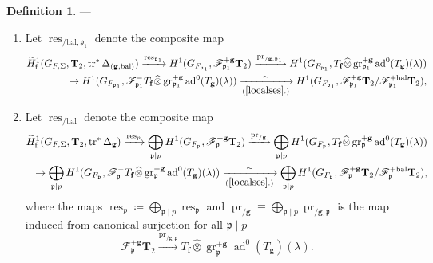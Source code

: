 \documentclass[10pt]{amsart}
\numberwithin{equation}{section}
\theoremstyle{definition}
\newtheorem{defn}[thm]{Definition}
\theoremstyle{remark} %
\newcommand{\ad}{\operatorname{ad}}
\DeclareMathOperator{\res}{res}
\DeclareMathOperator{\tr}{{tr}^*}
\renewcommand{\b}{\mathrm{bal}}
\newcommand{\f}{\mathbf{f}}
\newcommand{\scrF}{\mathscr{F}}
\newcommand{\g}{\mathbf{g}}
\newcommand{\p}{\mathfrak{p}}
\newcommand{\T}{\mathbf{T}}
\begin{document}
	\begin{defn} ---
		\begin{enumerate}
			\item Let $ \res_{/\b, \p_1} $ denote the composite map
			\begin{align}\label{resbal_1}
				\begin{aligned}
					\widetilde{H}^1_{\mathrm{f}}(G_{F,\Sigma},\T_{2}, \tr \Delta_{(\g,\b)}) \xrightarrow{\res_{\p_1}}  H^1(G_{F_{\p_1}},\scrF^{+\g}_{\p_1}\T_{2} ) \xrightarrow{\operatorname{pr}_{/\g,\p_1}}  H^1(G_{F_{\p_1}}, T_\f \widehat{\otimes} \operatorname{gr}^{+\g}_{\p_1}\ad^0(T_\g)(\lambda))   \\
					\rightarrow  H^1(G_{F_{\p_1}}, \scrF^{-}_{\p_1}T_\f \widehat{\otimes} \operatorname{gr}^{+\g}_{\p_1} \ad^0(T_\g)(\lambda)) \xrightarrow[(\ref{localses}.)]{\sim} H^1(G_{F_{\p_1}}, \scrF^{+\g}_{\p_1}\T_{2}/\scrF^{+\b}_{\p_1}\T_{2}),
				\end{aligned}
			\end{align}
			\item Let $ \res_{/\b}$ denote the composite map 
			\begin{align}\label{resbal_2}
				\begin{aligned}
					\widetilde{H}^1_{\mathrm{f}}(G_{F,\Sigma},\T_{2}, \tr \Delta_{\g}) \xrightarrow{\res_p} \bigoplus_{\p \mid p} H^1(G_{F_{\p}},\scrF^{+\g}_{\p}\T_{2} ) \xrightarrow{\operatorname{pr}_{/\g}}  \bigoplus_{\p \mid p} H^1(G_{F_{\p}}, T_\f \widehat{\otimes} \operatorname{gr}^{+\g}_{\p}\ad^0(T_\g)(\lambda))   \\
					\rightarrow \bigoplus_{\p \mid p} H^1(G_{F_{\p}}, \scrF^{-}_{\p}T_\f \widehat{\otimes} \operatorname{gr}^{+\g}_{\p} \ad^0(T_\g)(\lambda)) \xrightarrow[(\ref{localses}.)]{\sim} \bigoplus_{\p \mid p} H^1(G_{F_{\p}}, \scrF^{+\g}_{\p}\T_{2}/\scrF^{+\b}_{\p}\T_{2}),
				\end{aligned}
			\end{align}
			where the maps $ \res_p\coloneqq\bigoplus_{\p \mid p} \res_{\p} $ and $  \operatorname{pr}_{/\g} \equiv \bigoplus_{\p \mid p}\operatorname{pr}_{/\g,\p} $ is the map induced from canonical surjection for all $ \p \mid p $ 
			$$ \scrF^{+\g}_{\p}\T_{2} \xrightarrow{\operatorname{pr}_{/\g,\p}} T_\f \widehat{\otimes}\operatorname{gr}^{+\g}_{\p} \ad^0(T_\g)(\lambda). $$
		\end{enumerate}
		
	\end{defn}
\end{document}
